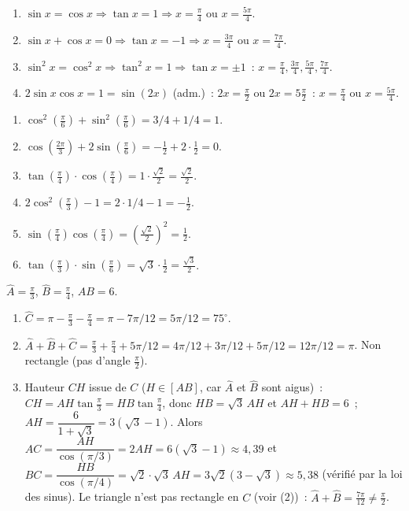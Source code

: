 
\begin{enumerate}
  \item $\sin x=\cos x\Rightarrow\tan x=1\Rightarrow x=\frac{\pi}{4}$ ou $x=\frac{5\pi}{4}$.
  \item $\sin x+\cos x=0\Rightarrow\tan x=-1\Rightarrow x=\frac{3\pi}{4}$ ou $x=\frac{7\pi}{4}$.
  \item $\sin^2x=\cos^2x\Rightarrow\tan^2x=1\Rightarrow\tan x=\pm1$~: $x=\frac{\pi}{4},\frac{3\pi}{4},\frac{5\pi}{4},\frac{7\pi}{4}$.
  \item $2\sin x\cos x=1=\sin(2x)$ (adm.)~: $2x=\frac{\pi}{2}$ ou $2x=5\frac{\pi}{2}$~: $x=\frac{\pi}{4}$ ou $x=\frac{5\pi}{4}$.
\end{enumerate}


\begin{enumerate}
  \item $\cos^2(\frac{\pi}{6})+\sin^2(\frac{\pi}{6})=3/4+1/4=1$.
  \item $\cos(\frac{2\pi}{3})+2\sin(\frac{\pi}{6})=-\frac{1}{2}+2\cdot\frac{1}{2}=0$.
  \item $\tan(\frac{\pi}{4})\cdot\cos(\frac{\pi}{4})=1\cdot\frac{\sqrt{2}}{2}=\frac{\sqrt{2}}{2}$.
  \item $2\cos^2(\frac{\pi}{3})-1=2\cdot1/4-1=-\frac{1}{2}$.
  \item $\sin(\frac{\pi}{4})\cos(\frac{\pi}{4})=(\frac{\sqrt{2}}{2})^2=\frac{1}{2}$.
  \item $\tan(\frac{\pi}{3})\cdot\sin(\frac{\pi}{6})=\sqrt{3}\cdot\frac{1}{2}=\frac{\sqrt{3}}{2}$.
\end{enumerate}


$\widehat{A}=\frac{\pi}{3}$, $\widehat{B}=\frac{\pi}{4}$, $AB=6$.
\begin{enumerate}
  \item $\widehat{C}=\pi-\frac{\pi}{3}-\frac{\pi}{4}=\pi-7\pi/12=5\pi/12=75^{\circ}$.
  \item $\widehat{A}+\widehat{B}+\widehat{C}=\frac{\pi}{3}+\frac{\pi}{4}+5\pi/12=4\pi/12+3\pi/12+5\pi/12=12\pi/12=\pi$.\checkmark
        Non rectangle (pas d'angle $\frac{\pi}{2}$).
  \item Hauteur $CH$ issue de $C$ ($H\in[AB]$, car $\widehat A$ et $\widehat B$ sont aigus)~: $CH=AH\tan\frac{\pi}{3}=HB\tan\frac{\pi}{4}$, donc $HB=\sqrt3\,AH$ et $AH+HB=6$~;
        $AH=\dfrac{6}{1+\sqrt3}=3(\sqrt3-1)$. Alors $AC=\dfrac{AH}{\cos(\pi/3)}=2AH=6(\sqrt3-1)\approx4{,}39$ et
        $BC=\dfrac{HB}{\cos(\pi/4)}=\sqrt2\cdot\sqrt3\,AH=3\sqrt2(3-\sqrt3)\approx5{,}38$ (v\'erifi\'e par la loi des sinus).
        Le triangle n'est pas rectangle en $C$ (voir (2))~: $\widehat A+\widehat B=\frac{7\pi}{12}\ne\frac{\pi}{2}$.
\end{enumerate}


